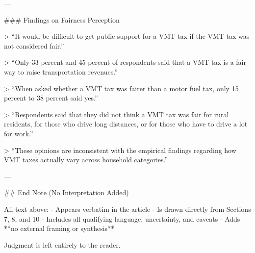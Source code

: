 ---

### Findings on Fairness Perception

> “It would be difficult to get public support for a VMT tax if the VMT tax was not considered fair.”

> “Only 33 percent and 45 percent of respondents said that a VMT tax is a fair way to raise transportation revenues.”

> “When asked whether a VMT tax was fairer than a motor fuel tax, only 15 percent to 38 percent said yes.”

> “Respondents said that they did not think a VMT tax was fair for rural residents, for those who drive long distances, or for those who have to drive a lot for work.”

> “These opinions are inconsistent with the empirical findings regarding how VMT taxes actually vary across household categories.”

---

## End Note (No Interpretation Added)

All text above:
- Appears verbatim in the article
- Is drawn directly from Sections 7, 8, and 10
- Includes all qualifying language, uncertainty, and caveats
- Adds **no external framing or synthesis**

Judgment is left entirely to the reader.
